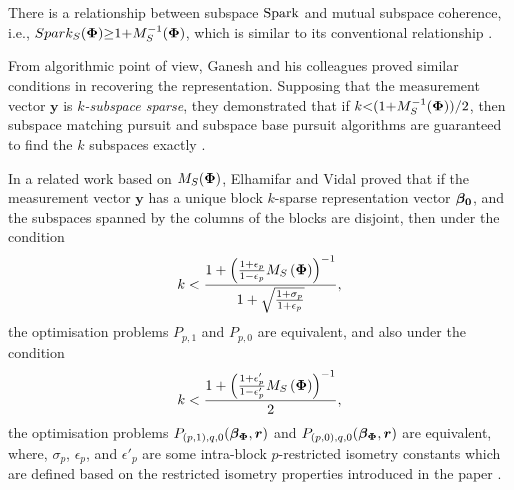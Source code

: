 There is a relationship between subspace $\mathrm{Spark}$ and mutual subspace coherence, i.e., $Spark_S(\boldsymbol{\Phi}) {\geq} 1 {+} M^{-1}_S(\boldsymbol{\Phi})$, which is similar to its conventional relationship \cite{Ganesh2009}.

From algorithmic point of view, Ganesh and his colleagues proved similar conditions in recovering the representation. 
Supposing that the measurement vector $\boldsymbol{y}$ is \emph{$k$-subspace sparse}, they demonstrated that if $k {<} (1 {+} M_S^{-1}(\boldsymbol{\Phi}))/2$, then subspace matching pursuit and subspace base pursuit algorithms are guaranteed to find the $k$ subspaces exactly \cite{Ganesh2009}.

In a related work based on $M_S(\boldsymbol{\Phi})$, Elhamifar and Vidal proved that if the measurement vector $\boldsymbol{y}$ has a unique block $k$-sparse representation vector $\boldsymbol{\beta_0}$, and the subspaces spanned by the columns of the blocks are disjoint, then under the condition
\begin{equation*}
k < \frac{1 + \left( \frac{1+\epsilon_p}{1-\epsilon_p} M_S\left( \boldsymbol{\Phi} \right) \right)^{-1}}{1+\sqrt{\frac{1+\sigma_p}{1+\epsilon_p}}},
\end{equation*}
the optimisation problems $P_{p,1}$ and $P_{p,0}$ are equivalent, and also under the condition
\begin{equation*}
k < \frac{1 + \left( \frac{1+\epsilon'_p}{1-\epsilon'_p} M_S\left( \boldsymbol{\Phi} \right) \right)^{-1}}{2},
\end{equation*}
the optimisation problems $P_{(p,1),q,0}(\boldsymbol{\beta}_{\boldsymbol{\Phi}},\boldsymbol{r})$ and $P_{(p,0),q,0}(\boldsymbol{\beta}_{\boldsymbol{\Phi}},\boldsymbol{r})$ are equivalent, where, $\sigma_p$, $\epsilon_p$, and $\epsilon'_p$ are some intra-block $p$-restricted isometry constants which are defined based on the restricted isometry properties introduced in the paper \cite{Elhamifar2011,Elhamifar2012b}.